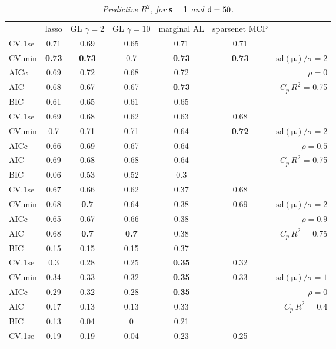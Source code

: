 \documentclass[12pt]{article}
\newcommand{\mr}[1]{\mathrm{#1}}
\newcommand{\bm}[1]{\mathbf{#1}}
\begin{document}
\begin{table}[p]\vspace{-.5cm}
\caption[l]{\label{r2}\it Predictive $R^2$, for ${\sf s}=1$ and  ${\sf d}=50$.}
\vspace{-.5cm}
\small{}
\begin{center}
\begin{tabular}{l*{5}{c}|r}
 & lasso & GL $\gamma=2$ & GL $\gamma=10$ & marginal AL & sparsenet MCP  &  \\
\cline{1-7}
CV.1se & 0.71 & 0.69 & 0.65 & 0.71 & 0.71 &\\
CV.min & {\bf 0.73} & {\bf 0.73} & 0.7 & {\bf 0.73} & {\bf 0.73} &  $\mr{sd}(\bm{\mu})/\sigma=2$ \\
AICc & 0.69 & 0.72 & 0.68 & 0.72 & & $\rho=0$ \\
AIC & 0.68 & 0.67 & 0.67 & {\bf 0.73} & & \multirow{2}{*}{$C_p ~ R^2$ = 0.75} \\
BIC & 0.61 & 0.65 & 0.61 & 0.65 & & \\
 \hline 
CV.1se & 0.69 & 0.68 & 0.62 & 0.63 & 0.68 &\\
CV.min & 0.7 & 0.71 & 0.71 & 0.64 & {\bf 0.72} &  $\mr{sd}(\bm{\mu})/\sigma=2$ \\
AICc & 0.66 & 0.69 & 0.67 & 0.64 & & $\rho=0.5$ \\
AIC & 0.69 & 0.68 & 0.68 & 0.64 & & \multirow{2}{*}{$C_p ~ R^2$ = 0.75} \\
BIC & 0.06 & 0.53 & 0.52 & 0.3 & & \\
 \hline 
CV.1se & 0.67 & 0.66 & 0.62 & 0.37 & 0.68 &\\
CV.min & 0.68 & {\bf 0.7} & 0.64 & 0.38 & 0.69 &  $\mr{sd}(\bm{\mu})/\sigma=2$ \\
AICc & 0.65 & 0.67 & 0.66 & 0.38 & & $\rho=0.9$ \\
AIC & 0.68 & {\bf 0.7} & {\bf 0.7} & 0.38 & & \multirow{2}{*}{$C_p ~ R^2$ = 0.75} \\
BIC & 0.15 & 0.15 & 0.15 & 0.37 & & \\
 \hline 
CV.1se & 0.3 & 0.28 & 0.25 & {\bf 0.35} & 0.32 &\\
CV.min & 0.34 & 0.33 & 0.32 & {\bf 0.35} & 0.33 &  $\mr{sd}(\bm{\mu})/\sigma=1$ \\
AICc & 0.29 & 0.32 & 0.28 & {\bf 0.35} & & $\rho=0$ \\
AIC & 0.17 & 0.13 & 0.13 & 0.33 & & \multirow{2}{*}{$C_p ~ R^2$ = 0.4} \\
BIC & 0.13 & 0.04 & 0 & 0.21 & & \\
 \hline 
CV.1se & 0.19 & 0.19 & 0.04 & 0.23 & 0.25 &\\

\end{tabular}
\end{center}
\end{table}
\end{document}
